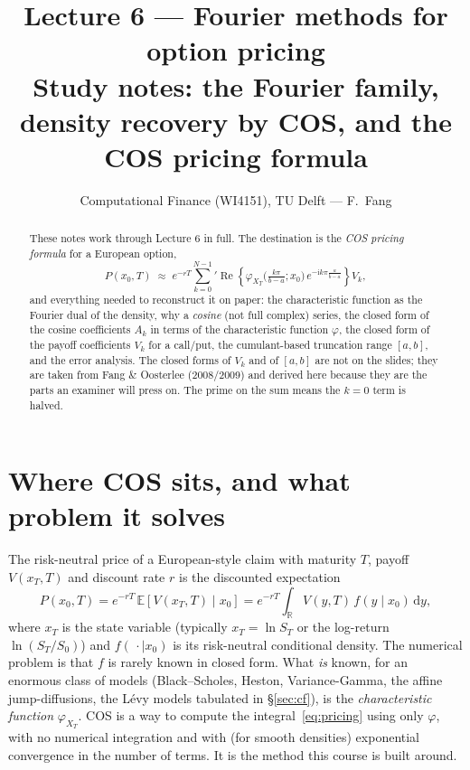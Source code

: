 \documentclass[11pt]{article}
\title{\textbf{Lecture 6 --- Fourier methods for option pricing}\\[2pt]
\large Study notes: the Fourier family, density recovery by COS, and the COS pricing formula}
\author{Computational Finance (WI4151), TU Delft --- F.\ Fang}
\date{}
\newcommand{\R}{\mathbb{R}}
\newcommand{\E}{\mathbb{E}}
\newcommand{\Real}{\operatorname{Re}}
\newcommand{\ii}{\mathrm{i}}
\newcommand{\dd}{\,\mathrm{d}}
\newcommand{\ch}{\varphi}
\begin{document}
\maketitle
\vspace{-1.2em}

\begin{abstract}
\noindent These notes work through Lecture 6 in full. The destination is the \emph{COS pricing
formula} for a European option,
\[
P(x_0,T)\;\approx\; e^{-rT}{\sum_{k=0}^{N-1}}' \Real\!\left\{\ch_{X_T}\!\Big(\tfrac{k\pi}{b-a};x_0\Big)\,
e^{-\ii k\pi\frac{a}{b-a}}\right\}V_k ,
\]
and everything needed to reconstruct it on paper: the characteristic function as the Fourier dual of the
density, why a \emph{cosine} (not full complex) series, the closed form of the cosine coefficients $A_k$ in
terms of the characteristic function $\ch$, the closed form of the payoff coefficients $V_k$ for a call/put,
the cumulant-based truncation range $[a,b]$, and the error analysis. The closed forms of $V_k$ and of $[a,b]$
are not on the slides; they are taken from Fang \& Oosterlee (2008/2009) and derived here because they are
the parts an examiner will press on. The prime on the sum means the $k=0$ term is halved.
\end{abstract}

\tableofcontents

\section{Where COS sits, and what problem it solves}

The risk-neutral price of a European-style claim with maturity $T$, payoff $V(x_T,T)$ and discount rate $r$ is
the discounted expectation
\begin{equation}\label{eq:pricing}
P(x_0,T)=e^{-rT}\,\E\!\left[V(x_T,T)\mid x_0\right]
= e^{-rT}\int_{\R} V(y,T)\,f(y\mid x_0)\dd y ,
\end{equation}
where $x_T$ is the state variable (typically $x_T=\ln S_T$ or the log-return $\ln(S_T/S_0)$) and
$f(\,\cdot\mid x_0)$ is its risk-neutral conditional density. The numerical problem is that $f$ is rarely
known in closed form. What \emph{is} known, for an enormous class of models (Black--Scholes, Heston,
Variance-Gamma, the affine jump-diffusions, the L\'evy models tabulated in \S\ref{sec:cf}), is the
\emph{characteristic function} $\ch_{X_T}$. COS is a way to compute the integral~\eqref{eq:pricing} using only
$\ch$, with no numerical integration and with (for smooth densities) exponential convergence in the number of
terms. It is the method this course is built around.
\end{document}
